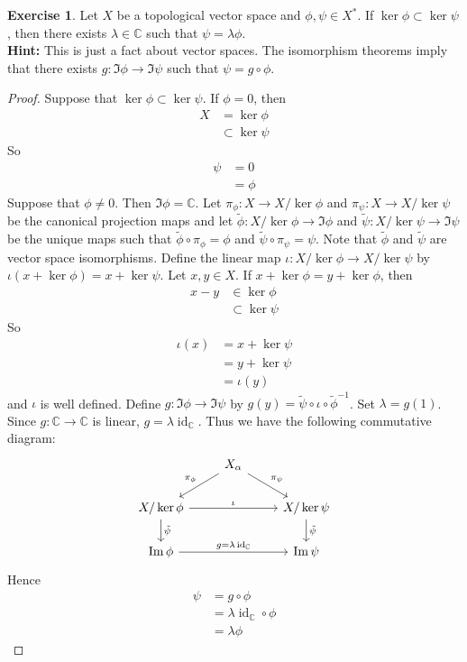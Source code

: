 \documentclass[12pt]{amsart}
\theoremstyle{definition}
\newtheorem{ex}[definition]{Exercise}
\newcommand{\al}{\alpha}
\newcommand{\lam}{\lambda}
\newcommand{\C}{\mathbb{C}}
\DeclareMathOperator{\id}{id}
\begin{document}
	\begin{ex}
		Let $X$ be a topological vector space and $\phi,\psi \in X^*$. If $\ker  \phi \subset \ker \psi$, then there exists $\lam \in \C$ such that $\psi = \lam \phi$.\\
		\textbf{Hint:} This is just a fact about vector spaces. The isomorphism theorems imply that there exists $g: \Im \phi \rightarrow \Im \psi$ such that $\psi = g \circ \phi$. 
	\end{ex}

	\begin{proof}
		Suppose that $\ker  \phi \subset \ker \psi$. If $\phi = 0$, then 
		\begin{align*}
			X 
			& = \ker \phi\\
			& \subset \ker \psi 
		\end{align*}
		So 
		\begin{align*}
			\psi 
			& = 0 \\
			& = \phi
		\end{align*}
		Suppose that $\phi \neq 0$. Then $\Im \phi = \C$. Let $\pi_{\phi}: X \rightarrow X / \ker \phi$ and $\pi_{\psi}: X \rightarrow X / \ker \psi$ be the canonical projection maps and let $\tilde{\phi}: X / \ker \phi \rightarrow \Im \phi$ and $\tilde{\psi}:X / \ker \psi \rightarrow \Im \psi$ be the unique maps such that $\tilde{\phi} \circ \pi_{\phi} = \phi$ and $\tilde{\psi} \circ \pi_{\psi} = \psi$. Note that $\tilde{\phi}$ and $\tilde{\psi}$ are vector space isomorphisms. Define the linear map $\iota: X /\ker \phi \rightarrow X / \ker \psi$ by $\iota(x + \ker \phi) = x + \ker \psi$. Let $x,y \in X$. If $x + \ker \phi = y + \ker \phi$, then 
		\begin{align*}
			x -y 
			& \in \ker \phi \\
			& \subset \ker \psi 
		\end{align*}
		So 
		\begin{align*}
			\iota(x) 
			& = x + \ker \psi \\
			& = y + \ker \psi \\
			& = \iota(y)
		\end{align*}
		and $\iota$ is well defined. Define $g: \Im \phi \rightarrow \Im \psi$ by $g(y) = \tilde{\psi} \circ \iota \circ \tilde{\phi}^{-1}$. Set $\lam = g(1)$. Since $g: \C \rightarrow \C$ is linear, $g = \lam \id_{\C}$. Thus we have the following commutative diagram: 
		\[ \begin{tikzcd}
			& X_{\al} \arrow[dr, "\pi_{\psi}"] \arrow[dl, "\pi_{\phi}"'] &  \\
			X / \ker \phi \arrow[rr, "\iota"] \arrow[d, "\tilde{\psi}"] & & X / \ker \psi  \arrow[d, "\tilde{\psi}"] \\
			\Im \phi \arrow[rr, "g = \lam \id_{\C}"] & & \Im \psi
		\end{tikzcd}
		\]
		Hence 
		\begin{align*}
			\psi
			& = g \circ \phi \\
			& = \lam \id_{\C} \circ \phi \\
			& = \lam \phi
		\end{align*} 
	\end{proof}
\end{document}
